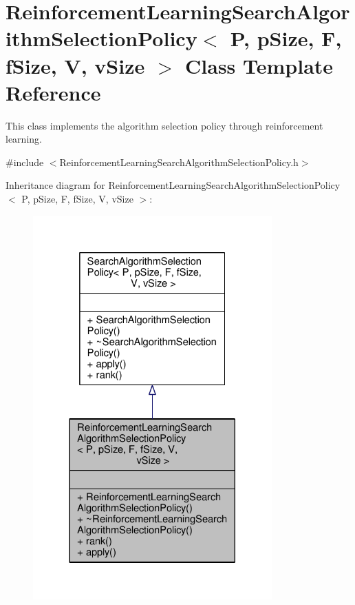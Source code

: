 \hypertarget{classReinforcementLearningSearchAlgorithmSelectionPolicy}{}\section{Reinforcement\+Learning\+Search\+Algorithm\+Selection\+Policy$<$ P, p\+Size, F, f\+Size, V, v\+Size $>$ Class Template Reference}
\label{classReinforcementLearningSearchAlgorithmSelectionPolicy}


This class implements the algorithm selection policy through reinforcement learning.  




{\ttfamily \#include $<$Reinforcement\+Learning\+Search\+Algorithm\+Selection\+Policy.\+h$>$}



Inheritance diagram for Reinforcement\+Learning\+Search\+Algorithm\+Selection\+Policy$<$ P, p\+Size, F, f\+Size, V, v\+Size $>$\+:
\nopagebreak
\begin{figure}[H]
\begin{center}
\leavevmode
\includegraphics[width=260pt]{classReinforcementLearningSearchAlgorithmSelectionPolicy__inherit__graph}
\end{center}
\end{figure}


